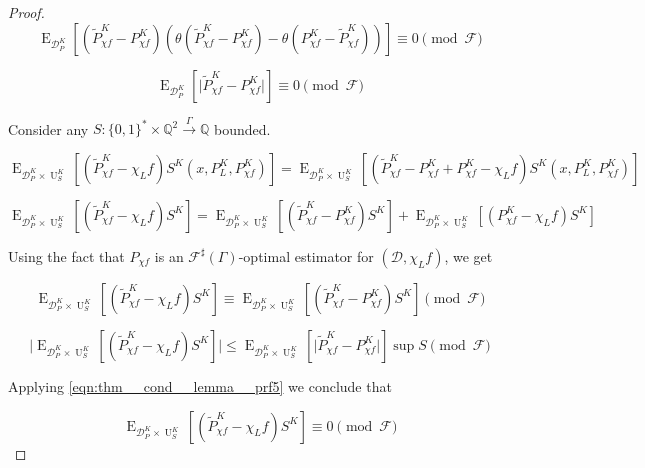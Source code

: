 \documentclass[11pt]{article}
\numberwithin{equation}{section}
\theoremstyle{definition}
\theoremstyle{plain}
\newcommand{\Bool}{\{0,1\}}
\newcommand{\Words}{{\Bool^*}}
\DeclareMathOperator{\E}{E}
\DeclareMathOperator{\Un}{U}
\newcommand{\Rats}{\mathbb{Q}}
\newcommand{\Abs}[1]{\lvert #1 \rvert}
\newcommand{\Dist}{\mathcal{D}}
\newcommand{\Fall}{\mathcal{F}}
\newcommand{\ESG}{\Fall^\sharp(\Gamma)}
\newcommand{\Scheme}{\xrightarrow{\Gamma}}
\begin{document}
\begin{proof}
\[\E_{\Dist_P^K}[(\tilde{P}_{\chi f}^K - P_{\chi f}^K) (\theta(\tilde{P}_{\chi f}^K-P_{\chi f}^K)- \theta(P_{\chi f}^K - \tilde{P}_{\chi f}^K))] \equiv 0 \pmod \Fall\]

\begin{equation}
\label{eqn:thm__cond__lemma__prf5}
\E_{\Dist_P^K}[\Abs{\tilde{P}_{\chi f}^K - P_{\chi f}^K}] \equiv 0 \pmod \Fall
\end{equation}

Consider any $S: \Words \times \Rats^2 \Scheme \Rats$ bounded.

\[\E_{\Dist_P^K \times \Un_S^K}[(\tilde{P}_{\chi f}^K - \chi_L f) S^K(x,P_L^K,P_{\chi f}^K)]=\E_{\Dist_P^K \times \Un_S^K}[(\tilde{P}_{\chi f}^K - P_{\chi f}^K + P_{\chi f}^K - \chi_L f) S^K(x,P_L^K,P_{\chi f}^K)]\]

\[\E_{\Dist_P^K \times \Un_S^K}[(\tilde{P}_{\chi f}^K - \chi_L f) S^K]=\E_{\Dist_P^K \times \Un_S^K}[(\tilde{P}_{\chi f}^K - P_{\chi f}^K) S^K]+\E_{\Dist_P^K \times \Un_S^K}[( P_{\chi f}^K - \chi_L f) S^K]\]

Using the fact that $P_{\chi f}$ is an $\ESG$-optimal estimator for $(\Dist, \chi_L f)$, we get

\[\E_{\Dist_P^K \times \Un_S^K}[(\tilde{P}_{\chi f}^K - \chi_L f) S^K] \equiv \E_{\Dist_P^K \times \Un_S^K}[(\tilde{P}_{\chi f}^K - P_{\chi f}^K) S^K] \pmod \Fall\]

\[\Abs{\E_{\Dist_P^K \times \Un_S^K}[(\tilde{P}_{\chi f}^K - \chi_L f) S^K]} \leq \E_{\Dist_P^K \times \Un_S^K}[\Abs{\tilde{P}_{\chi f}^K - P_{\chi f}^K}] \sup S \pmod \Fall\]

Applying \ref{eqn:thm__cond__lemma__prf5} we conclude that

\[\E_{\Dist_P^K \times \Un_S^K}[(\tilde{P}_{\chi f}^K - \chi_L f) S^K] \equiv 0 \pmod \Fall\]
%
\end{proof}
\end{document}
